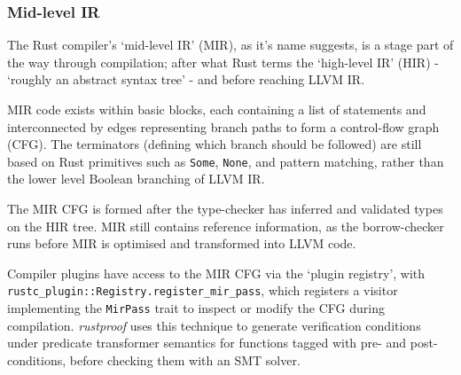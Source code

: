 \subsubsection{Mid-level IR}\label{rust-mir}
The Rust compiler's `mid-level IR' (MIR), as it's name suggests, is a stage part of the way through compilation; after what Rust terms the `high-level IR' (HIR) - `roughly an abstract syntax tree' - and before reaching LLVM IR. \cite{rust_mir}

MIR code exists within basic blocks, each containing a list of statements and interconnected by edges representing branch paths to form a control-flow graph (CFG). The terminators (defining which branch should be followed) are still based on Rust primitives such as \texttt{Some}, \texttt{None}, and pattern matching, rather than the lower level Boolean branching of LLVM IR. \cite{rust_mir}

The MIR CFG is formed after the type-checker has inferred and validated types on the HIR tree. MIR still contains reference information, as the borrow-checker runs before MIR is optimised and transformed into LLVM code. \cite{rust_mir}

Compiler plugins have access to the MIR CFG via the `plugin registry', with \texttt{rustc_plugin::Registry.register_mir_pass}, which registers a visitor implementing the \texttt{MirPass} trait to inspect or modify the CFG during compilation. \emph{rustproof} uses this technique to generate verification conditions under predicate transformer semantics for functions tagged with pre- and post-conditions, before checking them with an SMT solver. \cite{rust_rustproof}
